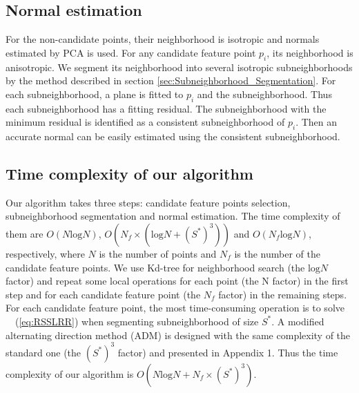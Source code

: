 \subsection{Normal estimation}
For the non-candidate points, their neighborhood is isotropic and normals estimated by PCA is used. For any candidate feature point $p_i$, its neighborhood is anisotropic. We segment its neighborhood into several isotropic subneighborhoods by the method described in section \ref{sec:Subneighborhood_Segmentation}.
For each subneighborhood, a plane is fitted to $p_i$ and the subneighborhood.
Thus each subneighborhood has a fitting residual. The subneighborhood with the minimum residual is identified as a consistent subneighborhood of $p_i$. Then an accurate normal can be easily estimated using the consistent subneighborhood.

\subsection{Time complexity of our algorithm}
\label{sec:timing}
Our algorithm takes three steps: candidate feature points selection, subneighborhood segmentation and normal estimation. The time complexity of them are $O(N\mathrm{log}N)$, $O(N_{f}\times(\mathrm{log}N + (S^{*})^{3}))$ and $O(N_{f}\mathrm{log}N)$, respectively, where $N$ is the number of points and $N_{f}$ is the number of the candidate feature points.
We use Kd-tree for neighborhood search (the $\mathrm{log}N$ factor) and repeat some local operations for each point (the N factor) in the first step and for each candidate feature point (the $N_{f}$ factor) in the remaining steps.
For each candidate feature point, the most time-consuming operation is to solve ~\eq~(\ref{eq:RSSLRR}) when segmenting  subneighborhood of size $S^{*}$. A modified alternating direction method (ADM) is designed with the same complexity of the standard one \cite{convergence} (the $(S^{*})^{3}$ factor) and presented in Appendix 1.
%
Thus the time complexity of our algorithm is $O(N\mathrm{log}N + N_{f}\times (S^{*})^{3})$.
